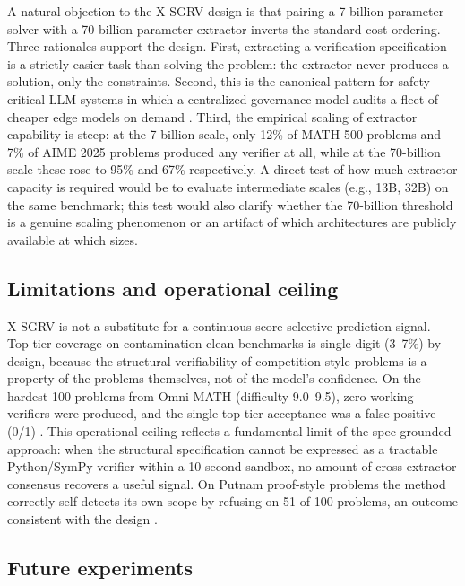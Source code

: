 \documentclass[11pt]{article}
\begin{document}
A natural objection to the X-SGRV design is that pairing a 7-billion-parameter solver with a 70-billion-parameter extractor inverts the standard cost ordering. Three rationales support the design. First, extracting a verification specification is a strictly easier task than solving the problem: the extractor never produces a solution, only the constraints. Second, this is the canonical pattern for safety-critical LLM systems in which a centralized governance model audits a fleet of cheaper edge models on demand \citep{ste2024, xiong2024llmuncertainty}. Third, the empirical scaling of extractor capability is steep: at the 7-billion scale, only 12\% of MATH-500 problems and 7\% of AIME 2025 problems produced any verifier at all, while at the 70-billion scale these rose to 95\% and 67\% respectively. A direct test of how much extractor capacity is required would be to evaluate intermediate scales (e.g., 13B, 32B) on the same benchmark; this test would also clarify whether the 70-billion threshold is a genuine scaling phenomenon or an artifact of which architectures are publicly available at which sizes.

\subsection{Limitations and operational ceiling}

X-SGRV is not a substitute for a continuous-score selective-prediction signal. Top-tier coverage on contamination-clean benchmarks is single-digit (3--7\%) by design, because the structural verifiability of competition-style problems is a property of the problems themselves, not of the model's confidence. On the hardest 100 problems from Omni-MATH (difficulty 9.0--9.5), zero working verifiers were produced, and the single top-tier acceptance was a false positive (0/1) \citep{omnimath2024}. This operational ceiling reflects a fundamental limit of the spec-grounded approach: when the structural specification cannot be expressed as a tractable Python/SymPy verifier within a 10-second sandbox, no amount of cross-extractor consensus recovers a useful signal. On Putnam proof-style problems the method correctly self-detects its own scope by refusing on 51 of 100 problems, an outcome consistent with the design \citep{amitayusht2024putnambench}.

\subsection{Future experiments}
\end{document}
